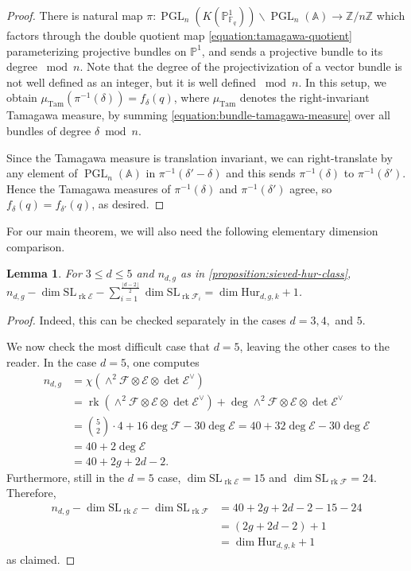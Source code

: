 \documentclass[12 pt]{amsart}
\theoremstyle{plain}
\newtheorem{lemma}[theorem]{Lemma}
\theoremstyle{definition}
\theoremstyle{remark}
\numberwithin{equation}{section}
\newcommand\bz{\mathbb Z}
\newcommand\sce{\mathscr E}
\newcommand\scf{\mathscr F}
\newcommand\hur[3]{\mathrm{Hur}_{#1,#2,#3}} %
\newcommand\systemdim[2]{n_{#1,#2}} %
\DeclareMathOperator\rk{rk}
\DeclareMathOperator\pgl{PGL}
\renewcommand\sl{\mathrm{SL}}
\newcommand{\on}[1]{\operatorname{#1}}
\begin{document}
\begin{proof}
	There is natural map
	$\pi: \pgl_n(K(\mathbb P^1_{\mathbb F_q})) \backslash \pgl_n(\mathbb A) \to \bz/n\bz$
	which factors through the double quotient map
	\eqref{equation:tamagawa-quotient}
	parameterizing projective bundles on $\mathbb P^1$, and sends a
	projective bundle to its degree $\bmod n$. Note that the degree of the
	projectivization of a vector bundle is not well defined as an integer,
	but it is well defined $\bmod n$.
	In this setup, we obtain $\mu_{\on{Tam}}(\pi^{-1}(\delta)) = f_\delta(q)$, where 
	$\mu_{\on{Tam}}$ denotes the right-invariant Tamagawa measure,
	by summing \eqref{equation:bundle-tamagawa-measure}
	over all bundles of degree $\delta \bmod n$.

		Since the Tamagawa measure is translation invariant, we can right-translate by
	any element of $\pgl_n(\mathbb A)$
		in $\pi^{-1}(\delta' - \delta)$ and this sends $\pi^{-1}(\delta)$
		to $\pi^{-1}(\delta')$. Hence the Tamagawa measures of
		$\pi^{-1}(\delta)$ and $\pi^{-1}(\delta')$ agree, so
		$f_\delta(q) =f_{\delta'}(q)$, as desired.
\end{proof}

For our main theorem, we will also need the following elementary dimension
comparison.

\begin{lemma}
	\label{lemma:dimension-aut-comparison}
	For $3 \leq d \leq 5$ and $\systemdim d g$ as in
	\autoref{proposition:sieved-hur-class},
	$\systemdim d g - \dim \sl_{\rk \sce} - \sum_{i=1}^{\frac{\lfloor d - 2
	\rfloor}{2}} \dim \sl_{\rk \scf_i} = \dim \hur d g
k + 1$.  
\end{lemma}
\begin{proof}
Indeed, this can be checked separately in the cases $d = 3, 4,$ and
$5$.

	We now check the most difficult case that $d = 5$, leaving the other
	cases to the reader.  In the case $d = 5$, one computes \begin{align*}
		\systemdim d g &= \chi(\wedge^2 \scf \otimes \sce \otimes
		\det \sce^\vee) \\ &= \rk \left(\wedge^2 \scf \otimes \sce \otimes
		\det \sce^\vee\right) + \deg \wedge^2 \scf \otimes \sce \otimes
		\det \sce^\vee \\ &= \binom{5}{2} \cdot 4 + 16 \deg \scf - 30 \deg
	\sce = 40 + 32 \deg \sce - 30 \deg \sce \\ &= 40 + 2 \deg \sce \\ &= 40
+ 2g + 2d - 2.  \end{align*} Furthermore, still in the $d = 5$ case, $\dim
\sl_{\rk \sce} = 15$ and $\dim \sl_{\rk \scf} = 24$.  Therefore, \begin{align*}
	\systemdim d g - \dim \sl_{\rk \sce} - \dim \sl_{\rk \scf} &= 40 + 2g + 2d -
2 - 15 - 24 \\ &= (2g+2d-2)+1 \\ &= \dim \hur d g k + 1 \end{align*} as claimed.   
\end{proof}
\end{document}

